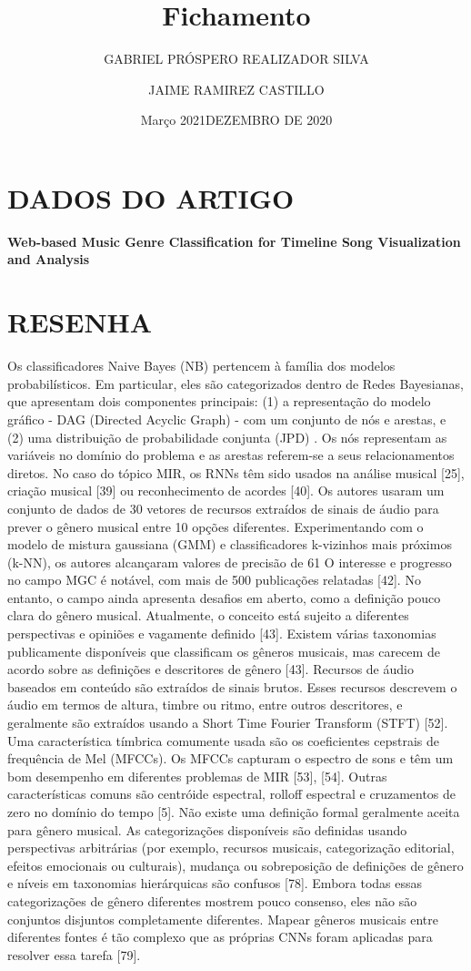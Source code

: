 \documentclass{article}
\title{Fichamento}
\author{GABRIEL PRÓSPERO REALIZADOR  SILVA}
\date{Março 2021}
\begin{document}
\maketitle

\section{DADOS DO ARTIGO}
\textbf{Web-based Music Genre Classification for Timeline Song Visualization and Analysis \\}
\author{JAIME RAMIREZ CASTILLO \\}
\date{DEZEMBRO DE 2020}

\section{RESENHA}
Os classificadores Naive Bayes (NB) pertencem à família dos modelos probabilísticos. Em particular, eles são categorizados dentro de Redes Bayesianas, que apresentam dois componentes principais: (1) a representação do modelo gráfico - DAG (Directed Acyclic Graph) - com um conjunto de nós e arestas, e (2) uma distribuição de probabilidade conjunta (JPD) . Os nós representam as variáveis no domínio do problema e as arestas referem-se a seus relacionamentos diretos.
No caso do tópico MIR, os RNNs têm sido usados ​​na análise musical [25], criação musical [39] ou reconhecimento de acordes [40].
Os autores usaram um conjunto de dados de 30 vetores de recursos extraídos de sinais de áudio para prever o gênero musical entre 10 opções diferentes. Experimentando com o modelo de mistura gaussiana (GMM) e classificadores k-vizinhos mais próximos (k-NN), os autores alcançaram valores de precisão de 61%
O interesse e progresso no campo MGC é notável, com mais de 500 publicações relatadas [42]. No entanto, o campo ainda apresenta desafios em aberto, como a definição pouco clara do gênero musical. Atualmente, o conceito está sujeito a diferentes perspectivas e opiniões e vagamente definido [43]. Existem várias taxonomias publicamente disponíveis que classificam os gêneros musicais, mas carecem de acordo sobre as definições e descritores de gênero [43].
Recursos de áudio baseados em conteúdo são extraídos de sinais brutos. Esses recursos descrevem o áudio em termos de altura, timbre ou ritmo, entre outros descritores, e geralmente são extraídos usando a Short Time Fourier Transform (STFT) [52].
Uma característica tímbrica comumente usada são os coeficientes cepstrais de frequência de Mel (MFCCs). Os MFCCs capturam o espectro de sons e têm um bom desempenho em diferentes problemas de MIR [53], [54]. Outras características comuns são centróide espectral, rolloff espectral e cruzamentos de zero no domínio do tempo [5].
Não existe uma definição formal geralmente aceita para gênero musical. As categorizações disponíveis são definidas usando perspectivas arbitrárias (por exemplo, recursos musicais, categorização editorial, efeitos emocionais ou culturais), mudança ou sobreposição de definições de gênero e níveis em taxonomias hierárquicas são confusos [78]. Embora todas essas categorizações de gênero diferentes mostrem pouco consenso, eles não são conjuntos disjuntos completamente diferentes. Mapear gêneros musicais entre diferentes fontes é tão complexo que as próprias CNNs foram aplicadas para resolver essa tarefa [79].
\end{document}

